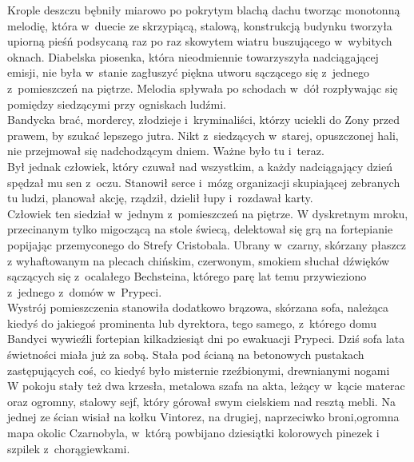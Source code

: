 \documentclass[../MAIN.tex]{subfiles}
\begin{document}
Krople deszczu bębniły miarowo po pokrytym blachą dachu tworząc monotonną
melodię, która w~duecie ze skrzypiącą, stalową, konstrukcją budynku tworzyła upiorną pieśń podsycaną raz po raz skowytem wiatru buszującego w~wybitych
oknach. Diabelska piosenka, która nieodmiennie towarzyszyła nadciągającej emisji, nie była w~stanie zagłuszyć piękna utworu sączącego się z~jednego z~pomieszczeń na piętrze. Melodia spływała po schodach w~dół rozpływając się pomiędzy siedzącymi przy ogniskach ludźmi.
\\
Bandycka brać, mordercy, złodzieje i~kryminaliści, którzy uciekli do Zony przed
prawem, by szukać lepszego jutra. Nikt z~siedzących w~starej, opuszczonej hali,
nie przejmował się nadchodzącym dniem. Ważne było tu i~teraz.
\\
Był jednak człowiek, który czuwał nad wszystkim, a każdy nadciągający dzień
spędzał mu sen z~oczu. Stanowił serce i~mózg organizacji skupiającej zebranych
tu ludzi, planował akcję, rządził, dzielił łupy i~rozdawał karty.
\\
Człowiek ten siedział w~jednym z~pomieszczeń na piętrze. W dyskretnym mroku,
przecinanym tylko migoczącą na stole świecą, delektował się grą na fortepianie popijając przemyconego do Strefy Cristobala. Ubrany w~czarny, skórzany płaszcz z wyhaftowanym na plecach chińskim, czerwonym, smokiem słuchał dźwięków sączących się z~ocalałego Bechsteina, którego parę lat temu przywieziono z~jednego z~domów w~Prypeci.
\\
Wystrój pomieszczenia stanowiła dodatkowo brązowa, skórzana sofa,
należąca kiedyś do jakiegoś prominenta lub dyrektora, tego samego, z~którego
domu Bandyci wywieźli fortepian kilkadziesiąt dni po ewakuacji Prypeci. Dziś
sofa lata świetności miała już za sobą. Stała pod ścianą na betonowych pustakach
zastępujących coś, co kiedyś było misternie rzeźbionymi, drewnianymi nogami
\\
W pokoju stały też dwa krzesła, metalowa szafa na akta, leżący w~kącie materac
oraz ogromny, stalowy sejf, który górował swym cielskiem nad resztą mebli. Na
jednej ze ścian wisiał na kołku Vintorez, na drugiej, naprzeciwko broni,ogromna
mapa okolic Czarnobyla, w~którą powbijano dziesiątki kolorowych pinezek i
szpilek z~chorągiewkami.
\end{document}
